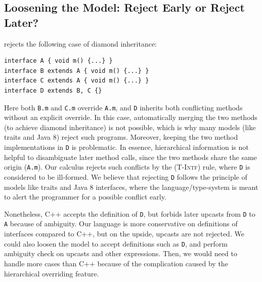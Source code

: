 \subsection{Loosening the Model: Reject Early or Reject Later?}\label{subsec:loosen}

\MIM{} rejects the following case of diamond inheritance:
\begin{lstlisting}
interface A { void m() {...} }
interface B extends A { void m() {...} }
interface C extends A { void m() {...} }
interface D extends B, C {}
\end{lstlisting}
Here both \lstinline|B.m| and \lstinline|C.m| override \lstinline|A.m|, and \lstinline|D| inherits
both conflicting methods without an explicit override. In this case, automatically merging 
the two methods (to achieve diamond inheritance) is not possible, which is why many 
models (like traits and Java 8) reject such programs. Moreover, keeping the two 
method implementations in \lstinline|D| is problematic. 
In essence, hierarchical information is 
not helpful to disambiguate later method calls, since the two methods share 
the same origin (\lstinline|A.m|). 
Our calculus rejects such conflicts by the \textsc{(T-Intf)} rule, where \lstinline|D| is considered to be ill-formed. 
We believe that rejecting \lstinline|D| follows the principle of models like traits and Java 8 interfaces, 
where the language/type-system is meant to alert the programmer for a possible conflict early.

Nonetheless,
 C++ accepts the definition of \lstinline|D|, but forbids later upcasts from \lstinline|D| to \lstinline|A| because of ambiguity. Our language is more conservative on definitions of interfaces compared to C++, but on the upside, upcasts are not rejected. We could also loosen the model to accept definitions such as \lstinline|D|, and perform ambiguity check on upcasts and other expressions. Then, we would need to handle more cases than C++ because of the complication caused by the hierarchical overriding feature. 

